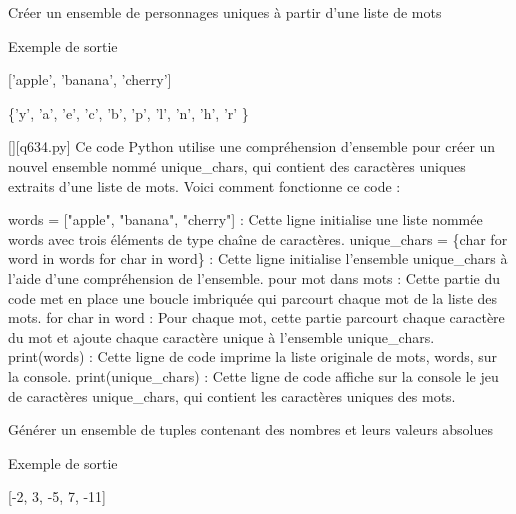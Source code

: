         \question
        Créer un ensemble de personnages uniques à partir d'une liste de mots

Exemple de sortie

['apple', 'banana', 'cherry']

\{'y', 'a', 'e', 'c', 'b', 'p', 'l', 'n', 'h', 'r' \}
        \par
        \begin{solution}
            \renewcommand{\nomfichier}{q634.py}
            \pythonfile{\chemincode \nomfichier}[][\nomfichier]
            Ce code Python utilise une compréhension d'ensemble pour créer un nouvel ensemble nommé unique\_chars, qui contient des caractères uniques extraits d'une liste de mots. Voici comment fonctionne ce code :

    words = ["apple", "banana", "cherry"] : Cette ligne initialise une liste nommée words avec trois éléments de type chaîne de caractères.
    unique\_chars = \{char for word in words for char in word\} : Cette ligne initialise l'ensemble unique\_chars à l'aide d'une compréhension de l'ensemble.
        pour mot dans mots : Cette partie du code met en place une boucle imbriquée qui parcourt chaque mot de la liste des mots.
        for char in word : Pour chaque mot, cette partie parcourt chaque caractère du mot et ajoute chaque caractère unique à l'ensemble unique\_chars.
    print(words) : Cette ligne de code imprime la liste originale de mots, words, sur la console.
    print(unique\_chars) : Cette ligne de code affiche sur la console le jeu de caractères unique\_chars, qui contient les caractères uniques des mots.
        \end{solution}
        

        \question
        Générer un ensemble de tuples contenant des nombres et leurs valeurs absolues

Exemple de sortie

[-2, 3, -5, 7, -11]

